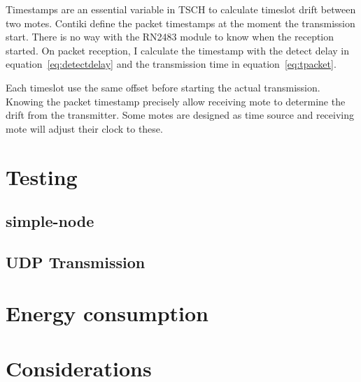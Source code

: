 Timestamps are an essential variable in TSCH to calculate timeslot drift
between two motes. 
Contiki define the packet timestamps at the moment the transmission start.
There is no way with the RN2483 module to know when the reception started.
On packet reception, I calculate the timestamp with the detect delay 
in equation~\ref{eq:detectdelay} and the transmission time in
equation~\ref{eq:tpacket}.

Each timeslot use the same offset before starting the actual transmission.
Knowing the packet timestamp precisely allow receiving mote to determine the
drift from the transmitter. Some motes are designed as time source and
receiving mote will adjust their clock to these.

\section{Testing}

\subsection{simple-node}

\subsection{UDP Transmission}

\section{Energy consumption}

\subsection{}

\section{Considerations}
